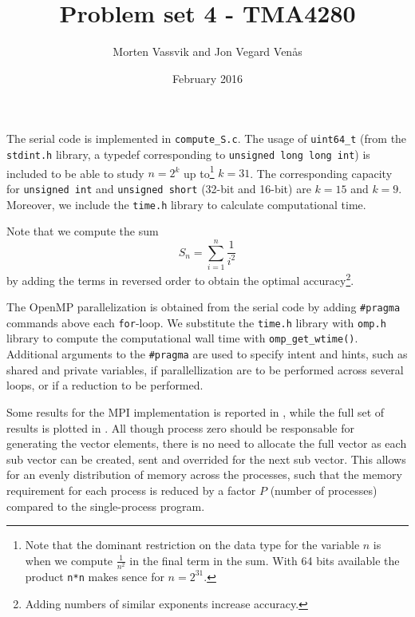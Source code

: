 \documentclass{article}
\title{Problem set 4 - TMA4280}
\author{Morten Vassvik and Jon Vegard Ven{\aa}s}
\date{February 2016}
\begin{document}
\maketitle

The serial code is implemented in \lstinline$compute_S.c$. The usage of \lstinline$uint64_t$ (from the \lstinline$stdint.h$ library, a typedef corresponding to \lstinline$unsigned long long int$) is included to be able to study $n=2^k$ up to\footnote{Note that the dominant restriction on the data type for the variable $n$ is when we compute $\frac{1}{n^2}$ in the final term in the sum. With 64 bits available the product \lstinline$n*n$ makes sence for $n=2^{31}$.} $k=31$. The corresponding capacity for \lstinline$unsigned int$ and \lstinline$unsigned short$ (32-bit and 16-bit) are $k=15$ and $k=9$. Moreover, we include the \lstinline$time.h$ library to calculate computational time.

Note that we compute the sum
\begin{equation*}
    S_n = \sum_{i=1}^n \frac{1}{i^2}
\end{equation*}
by adding the terms in reversed order to obtain the optimal accuracy\footnote{Adding numbers of similar exponents increase accuracy.}.

The OpenMP parallelization is obtained from the serial code by adding \lstinline$#pragma$ commands above each \lstinline$for$-loop. We substitute the \lstinline$time.h$ library with \lstinline$omp.h$ library to compute the computational wall time with \lstinline$omp_get_wtime()$. Additional arguments to the \lstinline$#pragma$ are used to specify intent and hints, such as shared and private variables,  if parallellization are to be performed across several loops, or if a reduction to be performed. 

Some results for the MPI implementation is reported in , while the full set of results is plotted in . All though process zero should be responsable for generating the vector elements, there is no need to allocate the full vector as each sub vector can be created, sent and overrided for the next sub vector. This allows for an evenly distribution of memory across the processes, such that the memory requirement for each process is reduced by a factor $P$ (number of processes) compared to the single-process program.
\end{document}
